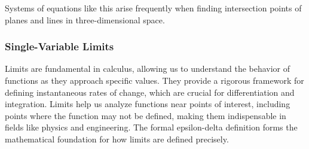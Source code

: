 \noindent Systems of equations like this arise frequently when finding intersection points of planes and lines in three-dimensional space.



\subsubsection*{Single-Variable Limits} 

\noindent Limits are fundamental in calculus, allowing us to understand the behavior of functions as they approach specific values. They provide a rigorous framework for defining instantaneous rates of change, which are crucial for differentiation and integration. Limits help us analyze functions near points of interest, including points where the function may not be defined, making them indispensable in fields like physics and engineering. The formal epsilon-delta definition forms the mathematical foundation for how limits are defined precisely.

